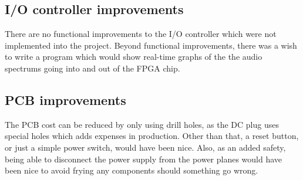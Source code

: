 \subsection{I/O controller improvements}

There are no functional improvements to the I/O controller which were not
implemented into the project. Beyond functional improvements, there was a
wish to write a program which would show real-time graphs of the the audio
spectrums going into and out of the FPGA chip.

\subsection{PCB improvements}
The PCB cost can be reduced by only using drill holes, as the DC plug uses special holes which adds expenses in production.
Other than that, a reset button, or just a simple power switch, would have been nice. Also, as an added safety, being able to disconnect the power supply from the power planes would have been nice to avoid frying any components should something go wrong.
